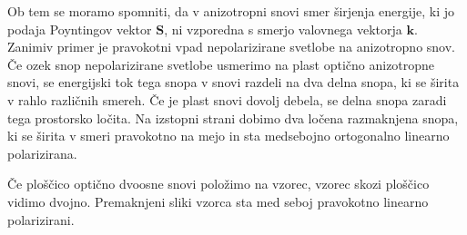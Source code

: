 Ob tem se moramo spomniti, da v anizotropni snovi smer širjenja energije, ki jo 
podaja Poyntingov vektor $\mathbf{S}$, ni vzporedna s smerjo valovnega vektorja $\mathbf{k}$.
Zanimiv primer je pravokotni vpad nepolarizirane svetlobe na anizotropno snov. Če
ozek snop nepolarizirane svetlobe usmerimo na plast optično anizotropne snovi, se 
energijski tok tega snopa v snovi razdeli na dva delna snopa, ki se širita
v rahlo različnih smereh. Če je plast snovi dovolj debela, se delna snopa zaradi tega 
prostorsko ločita. Na izstopni strani dobimo dva ločena razmaknjena 
snopa, ki se širita v smeri pravokotno na mejo in sta medsebojno ortogonalno linearno
polarizirana.


Če ploščico optično dvoosne snovi položimo na vzorec, vzorec skozi ploščico vidimo
dvojno. Premaknjeni sliki vzorca sta med seboj pravokotno linearno polarizirani.

